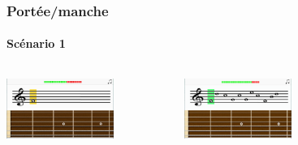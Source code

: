 \documentclass{beamer}
\begin{document}
	\begin{frame}

   		\frametitle{Portée/manche}

       		\framesubtitle{Scénario 1}

		\begin{columns}

			 \begin{column}{0.33\textwidth}

				\includegraphics[width=3.5cm]{images/portee_question.png}

			\end{column}

			 \begin{column}{0.33\textwidth}

				\includegraphics[width=3.5cm]{images/portee_bonne.png}

				
			\end{column}

			 \begin{column}{0.33\textwidth}

				
			\end{column}

		\end{columns} 

	\end{frame}
\end{document}
